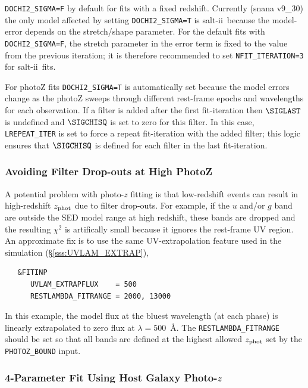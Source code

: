 \documentclass[12pt]{article}
\newcommand{\SALTII}{{\sc salt-ii}}
\newcommand{\Zphot}{z_{\rm phot}}
\newcommand{\obs}{observation}
\newcommand{\lam}{\lambda}
\begin{document}
{\tt DOCHI2\_SIGMA=F} by default for fits with
a fixed redshift. 
Currently (snana v9\_30) the only model affected by 
setting {\tt DOCHI2\_SIGMA=T} is \SALTII\ because
the model-error depends on the stretch/shape parameter.
For the default fits with {\tt DOCHI2\_SIGMA=F},
the stretch parameter in the error term is fixed 
to the value from the previous iteration; it is
therefore recommended to set {\tt NFIT\_ITERATION=3}
for \SALTII\ fits.



For photoZ fits {\tt DOCHI2\_SIGMA=T} is automatically 
set because the model errors change as the photoZ sweeps 
through different rest-frame epochs and wavelengths 
for each \obs.  
If a filter is added after the first fit-iteration
then $\SIGLAST$ is undefined and $\SIGCHISQ$ is set 
to zero for this filter.
In this case, {\tt LREPEAT\_ITER} is set to force
a repeat fit-iteration with the added filter; 
this logic ensures that $\SIGCHISQ$ is defined
for each filter in the last fit-iteration.


   \subsubsection{Avoiding Filter Drop-outs at High PhotoZ}
   \label{sss:avoid_filter_dropouts}

A potential problem with photo-$z$ fitting is that low-redshift events
can result in high-redshift $\Zphot$ due to filter drop-outs.
For example, if the $u$ and/or $g$ band are outside the SED model 
range at high redshift, these bands are dropped and the resulting 
$\chi^2$ is artifically small because it ignores the rest-frame UV region.
An approximate fix is to use the same UV-extrapolation feature used
in the simulation (\S\ref{sss:UVLAM_EXTRAP}),
\begin{verbatim}
   &FITINP
      UVLAM_EXTRAPFLUX    = 500          
      RESTLAMBDA_FITRANGE = 2000, 13000 
\end{verbatim}
In this example, the model flux at the bluest wavelength (at each phase)
is  linearly extrapolated to zero flux at $\lam=500$~\AA.
The {\tt RESTLAMBDA\_FITRANGE} should be set so that all bands
are defined at the highest allowed $\Zphot$ set by the
{\tt PHOTOZ\_BOUND} input.


  \clearpage
   \subsubsection{4-Parameter Fit Using Host Galaxy Photo-$z$ }
   \label{sss:zphot_host}
\end{document}
